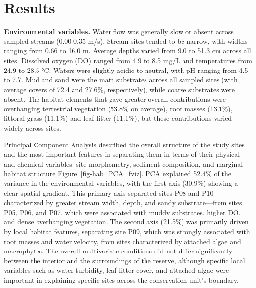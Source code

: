 \documentclass[
  american,
  letterpaper,
  DIV=11,
  numbers=noendperiod]{scrartcl}
\begin{document}
\section{Results}\label{results}

\textbf{Environmental variables.} Water flow was generally slow or
absent across sampled streams (0.00-0.35 m/s). Stream sites tended to be
narrow, with widths ranging from 0.66 to 16.0 m. Average depths varied
from 9.0 to 51.3 cm across all sites. Dissolved oxygen (DO) ranged from
4.9 to 8.5 mg/L and temperatures from 24.9 to 28.5 °C. Waters were
slightly acidic to neutral, with pH ranging from 4.5 to 7.7. Mud and
sand were the main substrates across all sampled sites (with average
covers of 72.4 and 27.6\%, respectively), while coarse substrates were
absent. The habitat elements that gave greater overall contributions
were overhanging terrestrial vegetation (53.8\% on average), root masses
(13.1\%), littoral grass (11.1\%) and leaf litter (11.1\%), but these
contributions varied widely across sites.

Principal Component Analysis described the overall structure of the
study sites and the most important features in separating them in terms
of their physical and chemical variables, site morphometry, sediment
composition, and marginal habitat structure
Figure~\ref{fig-hab_PCA_fviz}. PCA explained 52.4\% of the variance in
the environmental variables, with the first axis (30.9\%) showing a
clear spatial gradient. This primary axis separated sites P08 and
P10---characterized by greater stream width, depth, and sandy
substrate---from sites P05, P06, and P07, which were associated with
muddy substrates, higher DO, and dense overhanging vegetation. The
second axis (21.5\%) was primarily driven by local habitat features,
separating site P09, which was strongly associated with root masses and
water velocity, from sites characterized by attached algae and
macrophytes. The overall multivariate conditions did not differ
significantly between the interior and the surroundings of the reserve,
although specific local variables such as water turbidity, leaf litter
cover, and attached algae were important in explaining specific sites
across the conservation unit's boundary.
\end{document}
